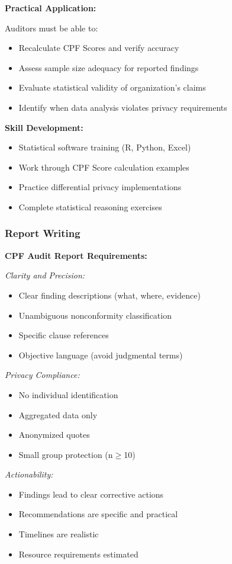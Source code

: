 \documentclass[11pt,a4paper]{article}
\begin{document}
\textbf{Practical Application:}

Auditors must be able to:
\begin{itemize}
\item Recalculate CPF Scores and verify accuracy
\item Assess sample size adequacy for reported findings
\item Evaluate statistical validity of organization's claims
\item Identify when data analysis violates privacy requirements
\end{itemize}

\textbf{Skill Development:}

\begin{itemize}
\item Statistical software training (R, Python, Excel)
\item Work through CPF Score calculation examples
\item Practice differential privacy implementations
\item Complete statistical reasoning exercises
\end{itemize}

\subsubsection{Report Writing}

\textbf{CPF Audit Report Requirements:}

\textit{Clarity and Precision:}
\begin{itemize}
\item Clear finding descriptions (what, where, evidence)
\item Unambiguous nonconformity classification
\item Specific clause references
\item Objective language (avoid judgmental terms)
\end{itemize}

\textit{Privacy Compliance:}
\begin{itemize}
\item No individual identification
\item Aggregated data only
\item Anonymized quotes
\item Small group protection (n$\geq$10)
\end{itemize}

\textit{Actionability:}
\begin{itemize}
\item Findings lead to clear corrective actions
\item Recommendations are specific and practical
\item Timelines are realistic
\item Resource requirements estimated
\end{itemize}
\end{document}
